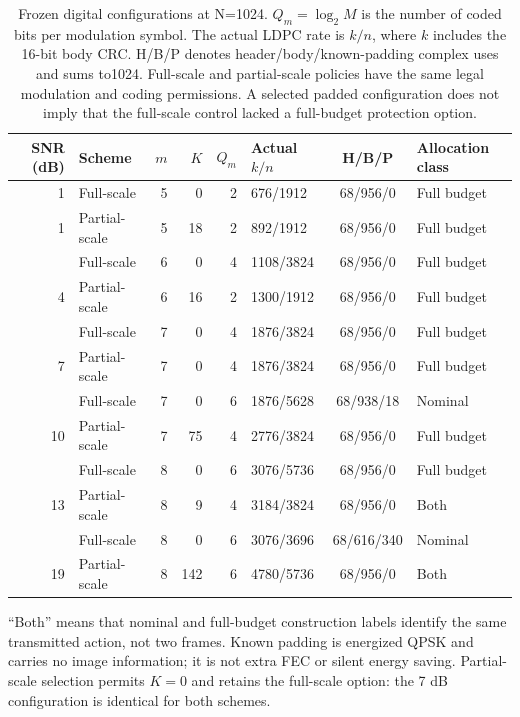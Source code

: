 \begin{table}[t]
\centering
\caption{Frozen digital configurations at N=1024. $Q_m=\log_2 M$ is the number
of coded bits per modulation symbol. The actual LDPC rate is $k/n$, where $k$
includes the 16-bit body CRC. H/B/P denotes header/body/known-padding complex
uses and sums to1024. Full-scale and partial-scale policies have the same legal
modulation and coding permissions. A selected padded configuration does not
imply that the full-scale control lacked a full-budget protection option.}
\label{tab:selected-digital-configs}
\small
\setlength{\tabcolsep}{4pt}
\begin{tabular*}{\textwidth}{@{\extracolsep{\fill}}rlrrrlcl@{}}
\toprule
SNR (dB) & Scheme & $m$ & $K$ & $Q_m$ & Actual $k/n$ & H/B/P & Allocation class \\
\midrule
1 & Full-scale & 5 & 0 & 2 & 676/1912 & 68/956/0 & Full budget \\
1 & Partial-scale & 5 & 18 & 2 & 892/1912 & 68/956/0 & Full budget \\
\addlinespace[2pt]
4 & Full-scale & 6 & 0 & 4 & 1108/3824 & 68/956/0 & Full budget \\
4 & Partial-scale & 6 & 16 & 2 & 1300/1912 & 68/956/0 & Full budget \\
\addlinespace[2pt]
7 & Full-scale & 7 & 0 & 4 & 1876/3824 & 68/956/0 & Full budget \\
7 & Partial-scale & 7 & 0 & 4 & 1876/3824 & 68/956/0 & Full budget \\
\addlinespace[2pt]
10 & Full-scale & 7 & 0 & 6 & 1876/5628 & 68/938/18 & Nominal \\
10 & Partial-scale & 7 & 75 & 4 & 2776/3824 & 68/956/0 & Full budget \\
\addlinespace[2pt]
13 & Full-scale & 8 & 0 & 6 & 3076/5736 & 68/956/0 & Full budget \\
13 & Partial-scale & 8 & 9 & 4 & 3184/3824 & 68/956/0 & Both \\
\addlinespace[2pt]
19 & Full-scale & 8 & 0 & 6 & 3076/3696 & 68/616/340 & Nominal \\
19 & Partial-scale & 8 & 142 & 6 & 4780/5736 & 68/956/0 & Both \\
\bottomrule
\end{tabular*}
\par\vspace{2pt}
\begin{minipage}{\textwidth}\footnotesize
``Both'' means that nominal and full-budget construction labels identify the
same transmitted action, not two frames. Known padding is energized QPSK and
carries no image information; it is not extra FEC or silent energy saving.
Partial-scale selection permits $K=0$ and retains the full-scale option: the
7 dB configuration is identical for both schemes.
\end{minipage}
\end{table}
